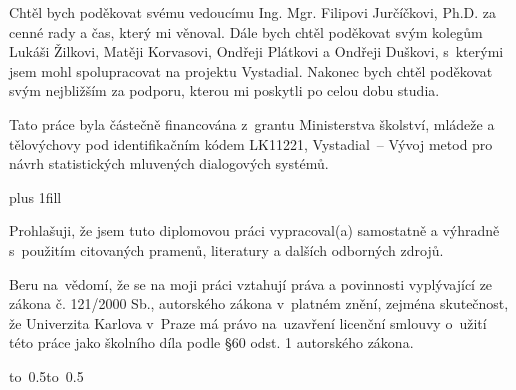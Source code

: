 \documentclass[12pt,a4paper]{report}
\let\openright=\clearpage
\begin{document}
\newpage



\openright

\noindent
Chtěl bych poděkovat svému vedoucímu Ing. Mgr. Filipovi Jurčíčkovi, Ph.D. za cenné rady a čas, který mi věnoval. 
Dále bych chtěl poděkovat svým kolegům Lukáši Žilkovi, Matěji Korvasovi, Ondřeji Plátkovi a Ondřeji Duškovi, s~kterými jsem mohl spolupracovat na projektu Vystadial.
Nakonec bych chtěl poděkovat svým nejbližším za podporu, kterou mi poskytli po celou dobu studia.

Tato práce byla částečně financována z~grantu Ministerstva školství, mládeže a tělovýchovy pod identifikačním kódem LK11221, Vystadial~-- Vývoj metod pro návrh statistických mluvených dialogových systémů.

\newpage


\vglue 0pt plus 1fill

\noindent
Prohlašuji, že jsem tuto diplomovou práci vypracoval(a) samostatně a výhradně
s~použitím citovaných pramenů, literatury a dalších odborných zdrojů.

\medskip\noindent
Beru na~vědomí, že se na moji práci vztahují práva a povinnosti vyplývající
ze zákona č. 121/2000 Sb., autorského zákona v~platném znění, zejména skutečnost,
že Univerzita Karlova v~Praze má právo na~uzavření licenční smlouvy o~užití této
práce jako školního díla podle §60 odst. 1 autorského zákona.

\vspace{10mm}

\hbox{\hbox to 0.5\hbox to 0.5}

\vspace{20mm}
\newpage

\end{document}
